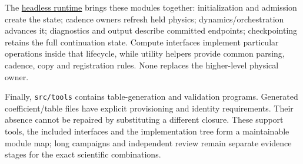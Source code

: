 The \href{../src/core/runtime/headless_runtime.cpp}{headless runtime} brings
these modules together: initialization and admission create the state;
cadence owners refresh held physics; dynamics/orchestration advances it;
diagnostics and output describe committed endpoints; checkpointing retains the
full continuation state. Compute interfaces implement particular operations
inside that lifecycle, while utility helpers provide common parsing, cadence,
copy and registration rules. None replaces the higher-level physical owner.

Finally, \texttt{src/tools} contains table-generation and validation programs.
Generated coefficient/table files have explicit provisioning and identity
requirements. Their absence cannot be repaired by substituting a different
closure. These support tools, the included interfaces and the implementation
tree form a maintainable module map; long campaigns and independent review
remain separate evidence stages for the exact scientific combinations.
